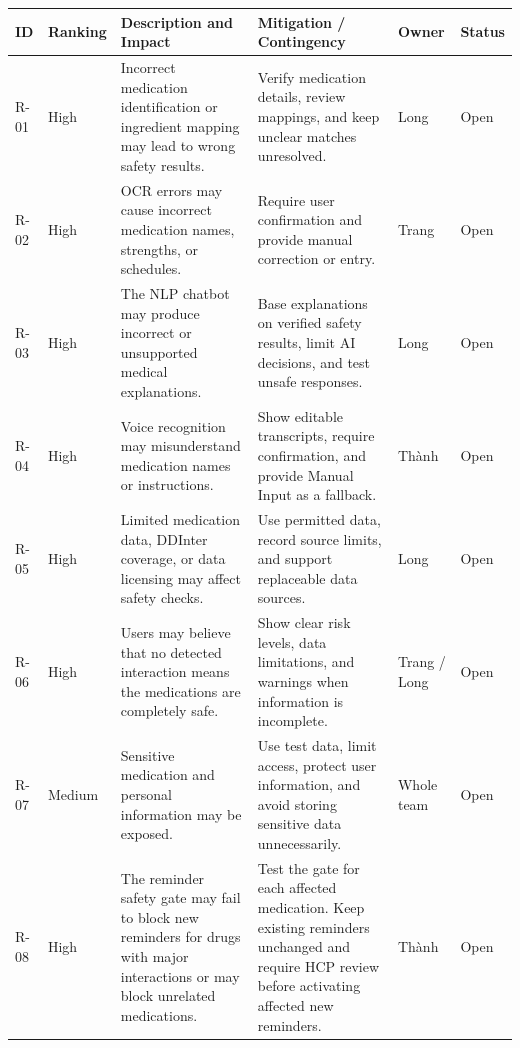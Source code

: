 \begin{longtable}{|L{0.07\textwidth}|L{0.10\textwidth}|L{0.27\textwidth}|L{0.25\textwidth}|L{0.12\textwidth}|L{0.09\textwidth}|}
\hline
\textbf{ID} & \textbf{Ranking} &
\textbf{Description and Impact} &
\textbf{Mitigation / Contingency} &
\textbf{Owner} & \textbf{Status}\\ \hline

R-01 & High
& Incorrect medication identification or ingredient
mapping may lead to wrong safety results.
& Verify medication details, review mappings,
and keep unclear matches unresolved.
& Long & Open\\ \hline

R-02 & High
& OCR errors may cause incorrect medication names,
strengths, or schedules.
& Require user confirmation and provide
manual correction or entry.
& Trang & Open\\ \hline

R-03 & High
& The NLP chatbot may produce incorrect or
unsupported medical explanations.
& Base explanations on verified safety results,
limit AI decisions, and test unsafe responses.
& Long & Open\\ \hline

R-04 & High
& Voice recognition may misunderstand medication
names or instructions.
& Show editable transcripts, require confirmation,
and provide Manual Input as a fallback.
& Thành & Open\\ \hline

R-05 & High
& Limited medication data, DDInter coverage,
or data licensing may affect safety checks.
& Use permitted data, record source limits,
and support replaceable data sources.
& Long & Open\\ \hline

R-06 & High
& Users may believe that no detected interaction
means the medications are completely safe.
& Show clear risk levels, data limitations,
and warnings when information is incomplete.
& Trang / Long & Open\\ \hline

R-07 & Medium
& Sensitive medication and personal information
may be exposed.
& Use test data, limit access,
protect user information, and avoid
storing sensitive data unnecessarily.
& Whole team & Open\\ \hline

R-08 & High
& The reminder safety gate may fail to block
new reminders for drugs with major interactions
or may block unrelated medications.
& Test the gate for each affected medication.
Keep existing reminders unchanged and require
HCP review before activating affected new reminders.
& Thành & Open\\ \hline


\end{longtable}
